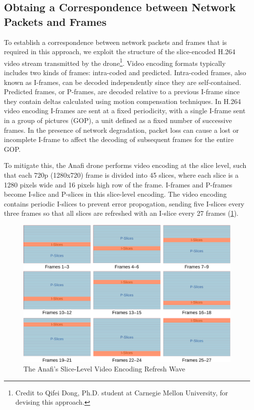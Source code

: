 \subsection{Obtaing a Correspondence between Network Packets and Frames}

To establish a correspondence between network packets and frames that is
required in this approach, we exploit the structure of the slice-encoded H.264
video stream transmitted by the drone\footnote{Credit to Qifei Dong, Ph.D.
student at Carnegie Mellon University, for devising this approach.}. Video
encoding formats typically includes two kinds of frames: intra-coded and
predicted.  Intra-coded frames, also known as I-frames, can be decoded
independently since they are self-contained. Predicted frames, or P-frames, are
decoded relative to a previous I-frame since they contain deltas calculated
using motion compensation techniques. In H.264 video encoding I-frames are sent
at a fixed periodicity, with a single I-frame sent in a group of pictures
(GOP), a unit defined as a fixed number of successive frames. In the presence
of network degradation, packet loss can cause a lost or incomplete I-frame to
affect the decoding of subsequent frames for the entire GOP.

To mitigate this, the Anafi drone performs video encoding at the slice level,
such that each 720p (1280x720) frame is divided into 45 slices, where each
slice is a 1280 pixels wide and 16 pixels high row of the frame.  I-frames and
P-frames become I-slice and P-slices in this slice-level encoding.  The video
encoding contains periodic I-slices to prevent error propogation, sending five
I-slices every three frames so that all slices are refreshed with an I-slice
every 27 frames (\cref{fig:slice-encoding}).

\begin{figure}[htbp]
    \centerline{\includegraphics[width = .8\textwidth]{figs/fig-slice-encoding-crop.pdf}}
    \caption{The Anafi's Slice-Level Video Encoding Refresh Wave}
\label{fig:slice-encoding}
\end{figure}

